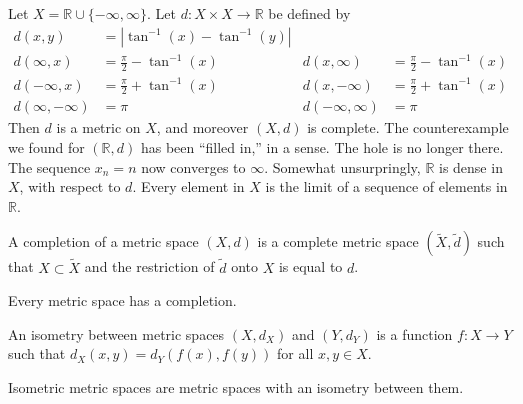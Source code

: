 \documentclass[crop=false,class=article,oneside]{standalone}
\begin{document}
            Let $X=\mathbb{R}\cup\{-\infty,\infty\}$.
            Let $d:X\times{X}\rightarrow\mathbb{R}$
            be defined by
            \begin{align*}
                d(x,y)
                &=|\tan^{-1}(x)-\tan^{-1}(y)|\\
                d(\infty,x)
                &=\frac{\pi}{2}-\tan^{-1}(x)
                &
                d(x,\infty)
                &=\frac{\pi}{2}-\tan^{-1}(x)\\
                d(-\infty,x)
                &=\frac{\pi}{2}+\tan^{-1}(x)
                &
                d(x,-\infty)
                &=\frac{\pi}{2}+\tan^{-1}(x)\\
                d(\infty,-\infty)
                &=\pi
                &
                d(-\infty,\infty)
                &=\pi
            \end{align*}
            Then $d$ is a metric on $X$, and moreover
            $(X,d)$ is complete. The counterexample
            we found for $(\mathbb{R},d)$ has been
            ``filled in,'' in a sense. The hole is
            no longer there. The sequence $x_{n}=n$
            now converges to $\infty$. Somewhat
            unsurpringly, $\mathbb{R}$ is
            dense in $X$, with respect to
            $d$. Every element in $X$ is the limit of
            a sequence of elements in $\mathbb{R}$.
            \begin{definition}
                A completion of a metric space
                $(X,d)$ is a complete metric space
                $(\tilde{X},\tilde{d})$
                such that
                $X\subset{\tilde{X}}$ and
                the restriction of
                $\tilde{d}$ onto $X$ is equal
                to $d$.
            \end{definition}
            \begin{theorem}
                Every metric space has
                a completion.
            \end{theorem}
            \begin{definition}
                An isometry between
                metric spaces
                $(X,d_{X})$ and
                $(Y,d_{Y})$ is a function
                $f:X\rightarrow{Y}$ such that
                $d_{X}(x,y)=d_{Y}(f(x),f(y))$
                for all $x,y\in{X}$.
            \end{definition}
            \begin{definition}
                Isometric metric spaces are metric spaces
                with an isometry between them.
            \end{definition}
\end{document}
